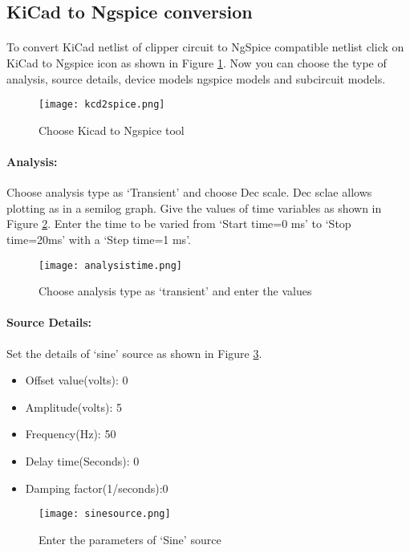 \subsection{KiCad to Ngspice conversion}

\paragraph{} To convert KiCad netlist of clipper circuit to NgSpice
compatible netlist click on KiCad to Ngspice icon as shown in Figure \ref{kcd2spiceclip}.  Now you can choose the type of analysis, source details, device models ngspice models and subcircuit models.


\begin{figure}[h]
\centering
\texttt{[image: kcd2spice.png]}
\caption{Choose Kicad to Ngspice tool}
\label{kcd2spiceclip}
\end{figure}


\paragraph{Analysis:}Choose analysis type as `Transient' and choose Dec scale. Dec sclae allows plotting as in a semilog graph.  Give the values of time variables as shown in Figure \ref{analysistime}. Enter the time to be varied from `Start time=0 ms' to `Stop time=20ms' with a `Step time=1 ms'.

\begin{figure}[h]
\centering
\texttt{[image: analysistime.png]}
\caption{Choose analysis type as `transient' and enter the values}
\label{analysistime}
\end{figure}

\paragraph{Source Details:} Set the details of `sine' source as shown in Figure \ref{sinesource}.
\begin{itemize}
\item
Offset value(volts): 0
\item
Amplitude(volts): 5
\item
Frequency(Hz): 50
\item
Delay time(Seconds): 0
\item
Damping factor(1/seconds):0

\end{itemize}
\begin{figure}[h]
\centering
\texttt{[image: sinesource.png]}
\caption{Enter the parameters of `Sine' source}
\label{sinesource}
\end{figure}


